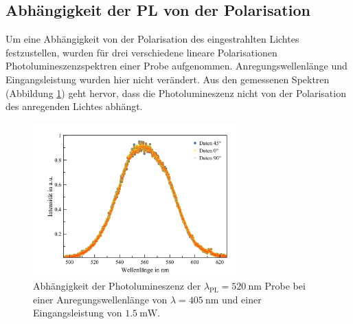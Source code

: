 \subsection{Abhängigkeit der PL von der Polarisation}
\label{sec:Polarisation}
Um eine Abhängigkeit von der Polarisation des eingestrahlten Lichtes festzustellen,
wurden für drei verschiedene lineare Polarisationen Photolumineszenzspektren einer
Probe aufgenommen. Anregungswellenlänge und  Eingangsleistung wurden hier nicht verändert.
Aus den gemessenen Spektren (Abbildung \ref{fig:Polarisation}) geht hervor, dass die
Photolumineszenz nicht von der Polarisation des anregenden Lichtes abhängt.
\begin{figure}[H]
  \centering
  \includegraphics[width=0.7\textwidth]{plots/Poldepplot.png}
  \caption{Abhängigkeit der Photolumineszenz der $\lambda_{\text{PL}}=\SI{520}{\nano\meter}$
   Probe bei einer Anregungswellenlänge von $\lambda=\SI{405}{\nano\meter}$ und einer Eingangsleistung von $\SI{1,5}{\milli\watt}$.}
   \label{fig:Polarisation}
\end{figure}

